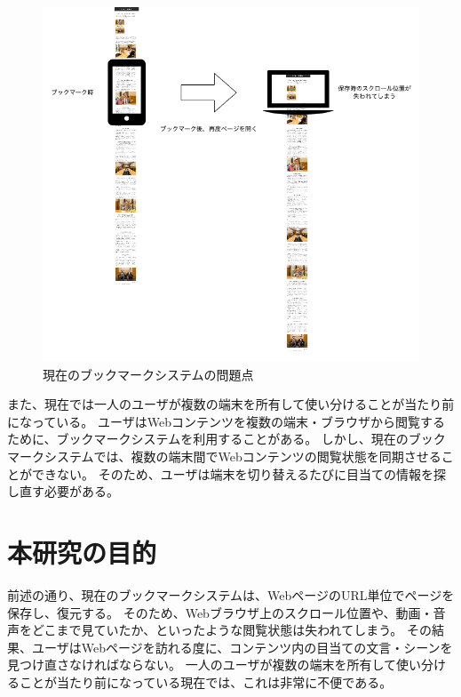 \begin{figure}[htbp]
  \label{fig:probrem-scroll-position}
  \begin{center}
    \includegraphics[bb=0 0 681 641,width=15cm]{img/010_introduction/probrem-scroll-position.pdf}
  \end{center}
  \caption{現在のブックマークシステムの問題点}
\end{figure}

また、現在では一人のユーザが複数の端末を所有して使い分けることが当たり前になっている。
ユーザはWebコンテンツを複数の端末・ブラウザから閲覧するために、ブックマークシステムを利用することがある。
しかし、現在のブックマークシステムでは、複数の端末間でWebコンテンツの閲覧状態を同期させることができない。
そのため、ユーザは端末を切り替えるたびに目当ての情報を探し直す必要がある。


\section{本研究の目的}
前述の通り、現在のブックマークシステムは、WebページのURL単位でページを保存し、復元する。
そのため、Webブラウザ上のスクロール位置や、動画・音声をどこまで見ていたか、といったような閲覧状態は失われてしまう。
その結果、ユーザはWebページを訪れる度に、コンテンツ内の目当ての文言・シーンを見つけ直さなければならない。
一人のユーザが複数の端末を所有して使い分けることが当たり前になっている現在では、これは非常に不便である。

